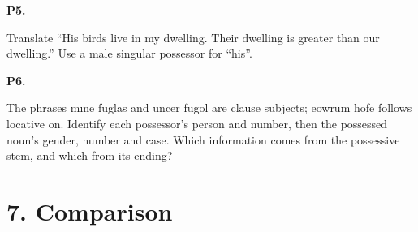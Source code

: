 \par\begin{minipage}{\linewidth}\raggedright
\textbf{P5.}

Translate “His birds live in my dwelling. Their dwelling is greater than our dwelling.” Use a male singular possessor for “his”.

\end{minipage}\par\addvspace{4pt}

\par\begin{minipage}{\linewidth}\raggedright
\textbf{P6.}

The phrases mīne fuglas and uncer fugol are clause subjects; ēowrum hofe follows locative on. Identify each possessor’s person and number, then the possessed noun’s gender, number and case. Which information comes from the possessive stem, and which from its ending?

\end{minipage}\par\addvspace{4pt}

\section*{7. Comparison}


